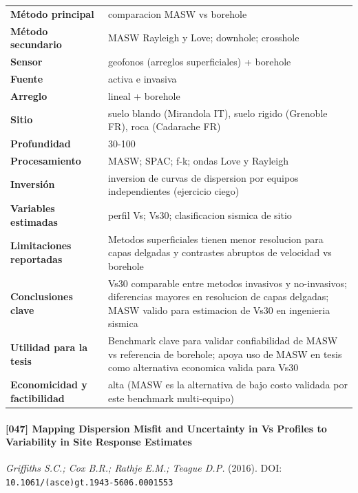 \begin{center}\scriptsize
\begin{tabularx}{\textwidth}{@{}>{\bfseries}p{3.3cm} X@{}}
\toprule
M\'etodo principal & comparacion MASW vs borehole \\
M\'etodo secundario & MASW Rayleigh y Love; downhole; crosshole \\
Sensor & geofonos (arreglos superficiales) + borehole \\
Fuente & activa e invasiva \\
Arreglo & lineal + borehole \\
Sitio & suelo blando (Mirandola IT), suelo rigido (Grenoble FR), roca (Cadarache FR) \\
Profundidad & 30-100 \\
Procesamiento & MASW; SPAC; f-k; ondas Love y Rayleigh \\
Inversi\'on & inversion de curvas de dispersion por equipos independientes (ejercicio ciego) \\
Variables estimadas & perfil Vs; Vs30; clasificacion sismica de sitio \\
Limitaciones reportadas & Metodos superficiales tienen menor resolucion para capas delgadas y contrastes abruptos de velocidad vs borehole \\
Conclusiones clave & Vs30 comparable entre metodos invasivos y no-invasivos; diferencias mayores en resolucion de capas delgadas; MASW valido para estimacion de Vs30 en ingenieria sismica \\
Utilidad para la tesis & Benchmark clave para validar confiabilidad de MASW vs referencia de borehole; apoya uso de MASW en tesis como alternativa economica valida para Vs30 \\
Economicidad y factibilidad & alta (MASW es la alternativa de bajo costo validada por este benchmark multi-equipo) \\
\bottomrule
\end{tabularx}
\end{center}

\paragraph{[047] Mapping Dispersion Misfit and Uncertainty in Vs Profiles to Variability in Site Response Estimates} \emph{Griffiths S.C.; Cox B.R.; Rathje E.M.; Teague D.P.} (2016).
{\scriptsize DOI: \texttt{10.1061/(asce)gt.1943-5606.0001553}}

